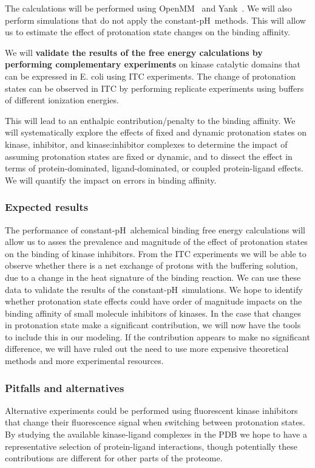 \documentclass[10pt,final]{article}
\newcommand{\pH}{p$\mathrm{H}$\ }
\begin{document}
The calculations will be performed using OpenMM~\cite{Eastman2013a} and Yank~\cite{Chodera2015a}. We will also perform simulations that do not apply the constant-\pH methods. This will allow us to estimate the effect of protonation state changes on the binding affinity.

We will \textbf{validate the results of the free energy calculations by performing complementary experiments} on kinase catalytic domains that can be expressed in E. coli using ITC experiments.
%
The change of protonation states can be observed in ITC by performing replicate experiments using buffers of different ionization energies.

This will lead to an enthalpic contribution/penalty to the binding affinity.
%
We will systematically explore the effects of fixed and dynamic protonation states on kinase, inhibitor, and kinase:inhibitor complexes to determine the impact of assuming protonation states are fixed or dynamic, and to dissect the effect in terms of protein-dominated, ligand-dominated, or coupled protein-ligand effects.
%
We will quantify the impact on errors in binding affinity.

\subsubsection*{Expected results}
The performance of constant-\pH alchemical binding free energy calculations will allow us to asses the prevalence and magnitude of the effect of protonation states on the binding of kinase inhibitors.
%
From the ITC experiments we will be able to observe whether there is a net exchange of protons with the buffering solution, due to a change in the heat signature of the binding reaction.
%
We can use these data to validate the results of the constant-\pH simulations.
%
We hope to identify whether protonation state effects could have order of magnitude impacts on the binding affinity of small molecule inhibitors of kinases.
%
In the case that changes in protonation state make a significant contribution, we will now have the tools to include this in our modeling.
%
If the contribution appears to make no significant difference, we will have ruled out the need to use more expensive theoretical methods and more experimental resources.


\subsubsection*{Pitfalls and alternatives}
Alternative experiments could be performed using fluorescent kinase inhibitors that change their fluorescence signal when switching between protonation states.
%
By studying the available kinase-ligand complexes in the PDB we hope to have a representative selection of protein-ligand interactions, though potentially these contributions are different for other parts of the proteome.
%
\end{document}
